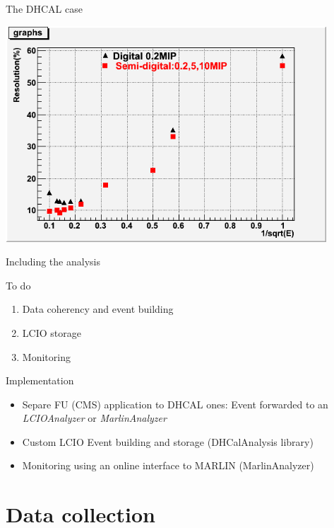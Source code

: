\begin{frame}{The DHCAL case}
  \centerline{\includegraphics[width=0.9\textwidth]{images/DigitalSemiDigital}}
\end{frame}

\begin{frame}{Including the analysis}

  \begin{block}{ To do}
    \begin{enumerate}
    \item Data coherency and event building
    \item LCIO storage
    \item Monitoring
    \end{enumerate}
  \end{block}
  \pause 
  \begin{block}{ Implementation}
    \begin{itemize}
    \item Separe FU (CMS) application to DHCAL ones: Event forwarded to an {\sl LCIOAnalyzer } or {\sl MarlinAnalyzer}
    \item Custom LCIO Event building and storage (DHCalAnalysis library)
    \item Monitoring using an online interface to MARLIN (MarlinAnalyzer)
    \end{itemize}
  \end{block}

\end{frame}

\section{Data collection}

